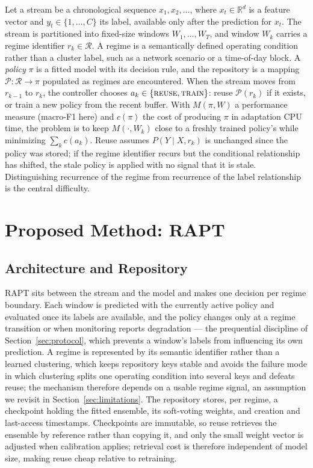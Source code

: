 \documentclass[conference]{IEEEtran}
\begin{document}
Let a stream be a chronological sequence $x_1, x_2, \dots$, where
$x_t \in \mathbb{R}^d$ is a feature vector and $y_t \in \{1,\dots,C\}$ its label,
available only after the prediction for $x_t$. The stream is partitioned into
fixed-size windows $W_1, \dots, W_T$, and window $W_k$ carries a regime identifier
$r_k \in \mathcal{R}$. A regime is a semantically defined operating condition
rather than a cluster label, such as a network scenario or a time-of-day block. A
\emph{policy} $\pi$ is a fitted model with its decision rule, and the repository is a
mapping
$\mathcal{P}: \mathcal{R} \rightarrow \pi$ populated as regimes are encountered.
When the stream moves from $r_{k-1}$ to $r_k$, the
controller chooses $a_k \in \{\textsc{reuse}, \textsc{train}\}$: reuse
$\mathcal{P}(r_k)$ if it exists, or train a new policy from the recent buffer. With
$M(\pi, W)$ a performance measure (macro-F1 here) and $c(\pi)$ the cost of producing
$\pi$ in adaptation CPU time, the problem is to keep $M(\cdot, W_k)$ close to a
freshly trained policy's while minimizing $\sum_k c(a_k)$. Reuse assumes
$P(Y \mid X, r_k)$ is unchanged since the policy was stored; if the regime identifier
recurs but the conditional relationship has shifted, the stale policy is applied with
no signal that it is stale. Distinguishing recurrence of the regime from recurrence
of the label relationship is the central difficulty.

\section{Proposed Method: RAPT}

\subsection{Architecture and Repository}
RAPT sits between the stream and the model and makes one decision per regime
boundary. Each window is predicted with the currently active policy and evaluated
once its labels are available, and the policy changes only at a regime transition or
when monitoring reports degradation --- the prequential discipline of
Section~\ref{sec:protocol}, which prevents a window's labels from influencing its own
prediction. A regime is represented by its semantic identifier rather than a learned
clustering, which keeps repository keys stable and avoids the failure mode in which
clustering splits one operating condition into several keys and defeats reuse; the
mechanism therefore depends on a usable regime signal, an assumption we revisit in
Section~\ref{sec:limitations}. The repository stores, per regime, a checkpoint
holding the fitted ensemble, its soft-voting weights, and creation and last-access
timestamps. Checkpoints are immutable, so reuse retrieves the ensemble by reference
rather than copying it, and only the small weight vector is adjusted when calibration
applies; retrieval cost is therefore independent of model size, making reuse cheap
relative to retraining.
\end{document}
